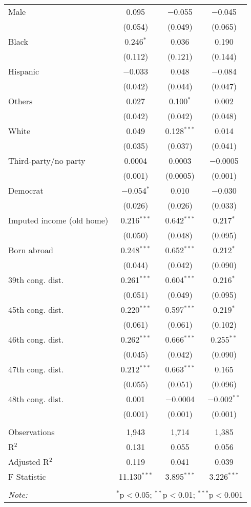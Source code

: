\begin{tabular}{@{\extracolsep{5pt}}lccc}
  Male & 0.095 & $-$0.055 & $-$0.045 \\ 
  & (0.054) & (0.049) & (0.065) \\ 
  Black & 0.246$^{*}$ & 0.036 & 0.190 \\ 
  & (0.112) & (0.121) & (0.144) \\ 
  Hispanic & $-$0.033 & 0.048 & $-$0.084 \\ 
  & (0.042) & (0.044) & (0.047) \\ 
  Others & 0.027 & 0.100$^{*}$ & 0.002 \\ 
  & (0.042) & (0.042) & (0.048) \\ 
  White & 0.049 & 0.128$^{***}$ & 0.014 \\ 
  & (0.035) & (0.037) & (0.041) \\ 
  Third-party/no party & 0.0004 & 0.0003 & $-$0.0005 \\ 
  & (0.001) & (0.0005) & (0.001) \\ 
  Democrat & $-$0.054$^{*}$ & 0.010 & $-$0.030 \\ 
  & (0.026) & (0.026) & (0.033) \\ 
  Imputed income (old home) & 0.216$^{***}$ & 0.642$^{***}$ & 0.217$^{*}$ \\ 
  & (0.050) & (0.048) & (0.095) \\ 
  Born abroad & 0.248$^{***}$ & 0.652$^{***}$ & 0.212$^{*}$ \\ 
  & (0.044) & (0.042) & (0.090) \\ 
  39th cong. dist. & 0.261$^{***}$ & 0.604$^{***}$ & 0.216$^{*}$ \\ 
  & (0.051) & (0.049) & (0.095) \\ 
  45th cong. dist. & 0.220$^{***}$ & 0.597$^{***}$ & 0.219$^{*}$ \\ 
  & (0.061) & (0.061) & (0.102) \\ 
  46th cong. dist. & 0.262$^{***}$ & 0.666$^{***}$ & 0.255$^{**}$ \\ 
  & (0.045) & (0.042) & (0.090) \\ 
  47th cong. dist. & 0.212$^{***}$ & 0.663$^{***}$ & 0.165 \\ 
  & (0.055) & (0.051) & (0.096) \\ 
  48th cong. dist. & 0.001 & $-$0.0004 & $-$0.002$^{**}$ \\ 
  & (0.001) & (0.001) & (0.001) \\ 
 \hline \\[-1.8ex] 
Observations & 1,943 & 1,714 & 1,385 \\ 
R$^{2}$ & 0.131 & 0.055 & 0.056 \\ 
Adjusted R$^{2}$ & 0.119 & 0.041 & 0.039 \\ 
F Statistic & 11.130$^{***}$ & 3.895$^{***}$ & 3.226$^{***}$ \\ 
\hline 
\hline \\[-1.8ex] 
\textit{Note:}  & \multicolumn{3}{r}{$^{*}$p$<$0.05; $^{**}$p$<$0.01; $^{***}$p$<$0.001} \\ 
\end{tabular} 
